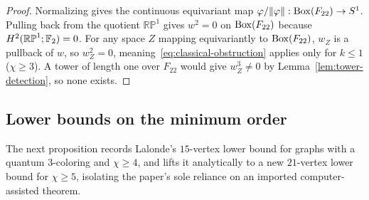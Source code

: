\begin{proof}
Normalizing gives the continuous equivariant map $\varphi/\|\varphi\|:\operatorname{Box}(F_{22})\to S^1$. Pulling back from the quotient $\mathbb{RP}^1$ gives $w^2=0$ on $\operatorname{Box}(F_{22})$ because $H^2(\mathbb{RP}^1;\mathbb F_2)=0$. For any space $Z$ mapping equivariantly to $\operatorname{Box}(F_{22})$, $w_Z$ is a pullback of $w$, so $w_Z^2=0$, meaning~\eqref{eq:classical-obstruction} applies only for $k\le1$ ($\chi\ge3$). A tower of length one over $F_{22}$ would give $w_Z^3\ne0$ by Lemma~\ref{lem:tower-detection}, so none exists.
\end{proof}

\subsection{Lower bounds on the minimum order}\label{sec:small-lower}

The next proposition records Lalonde's $15$-vertex lower bound for graphs with a quantum $3$-coloring and $\chi\ge4$, and lifts it analytically to a new $21$-vertex lower bound for $\chi\ge5$, isolating the paper's sole reliance on an imported computer-assisted theorem.


